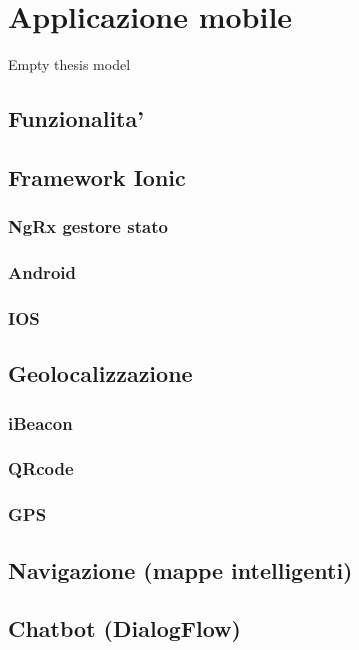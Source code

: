\chapter{Applicazione mobile}
Empty thesis model

\section{Funzionalita'}
\section{Framework Ionic}
\subsection{NgRx gestore stato}
\subsection{Android}
\subsection{IOS}
\section{Geolocalizzazione}
\subsection{iBeacon}
\subsection{QRcode}
\subsection{GPS}
\section{Navigazione (mappe intelligenti)}
\section{Chatbot (DialogFlow)}
